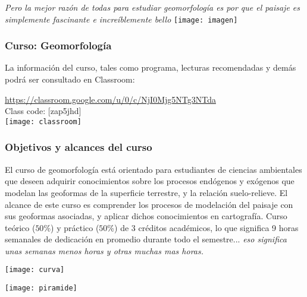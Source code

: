 \documentclass[12pt]{beamer}
\begin{document}
\begin{frame}
\begin{center}
\small{\emph{Pero la mejor razón de todas para estudiar geomorfología es por que el paisaje es simplemente fascinante e increíblemente bello}}
\texttt{[image: imagen]}
\end{center}
\end{frame}
\begin{frame}
\frametitle{Curso: Geomorfología}
\justifying
\small{
La información del curso, tales como programa, lecturas recomendadas y demás podrá ser consultado en Classroom:\vfill
\begin{center}
\url{https://classroom.google.com/u/0/c/NjI0Mjg5NTg3NTda}\\
Class code: [zap5jhd]\\
\texttt{[image: classroom]}
\end{center}}
\end{frame}
\begin{frame}
\frametitle{Objetivos y alcances del curso}
El curso de geomorfología está orientado para estudiantes de ciencias ambientales que deseen adquirir conocimientos sobre los procesos endógenos y exógenos que modelan las geoformas de la superficie terrestre, y la relación suelo-relieve.\vfill
El alcance de este curso es comprender los procesos de modelación del paisaje con sus geoformas asociadas, y aplicar dichos conocimientos en cartografía.\vfill
Curso teórico ($50$\%) y práctico ($50$\%) de $3$ créditos académicos, lo que significa 9 horas semanales de dedicación en promedio durante todo el semestre... \emph{eso significa unas semanas menos horas y otras muchas mas horas.}
\end{frame}
\begin{frame}
\begin{center}
\texttt{[image: curva]}
\end{center}
\end{frame}
\begin{frame}
\begin{center}
\texttt{[image: piramide]}
\end{center}
\end{frame}
\end{document}
